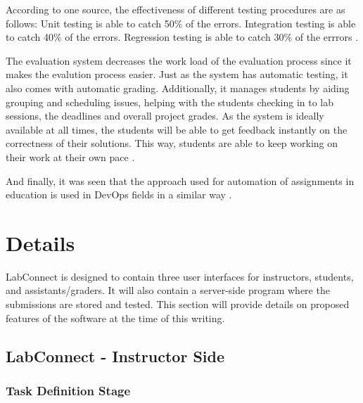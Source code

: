 \documentclass[a4paper, 12pt]{article}
\begin{document}
    According to one source, the effectiveness of different testing procedures are as follows:
    Unit testing is able to catch 50\% of the errors.
    Integration testing is able to catch 40\% of the errors.
    Regression testing is able to catch 30\% of the errrors \cite{Fenton2018}.

    The evaluation system decreases the work load of the evaluation process since it makes the evalution process easier.
    Just as the system has automatic testing, it also comes with automatic grading. Additionally, it manages students by aiding
    grouping and scheduling issues, helping with the students checking in to lab sessions, the deadlines and overall project grades.
    As the system is ideally available at all times, the students will be able to get feedback instantly on the correctness of
    their solutions. This way, students are able to keep working on their work at their own pace \cite{Nogueira2011}.

    And finally, it was seen that the approach used for automation of assignments in education is used in DevOps fields in a similar way \cite{Faber2020}.

    \section{Details}

    LabConnect is designed to contain three user interfaces for instructors, students,
    and assistants/graders. It will also contain a server-side program where the submissions
    are stored and tested. This section will provide details on proposed features of the software at the time of this writing.

    \subsection{LabConnect - Instructor Side}

    \subsubsection{Task Definition Stage}
\end{document}
